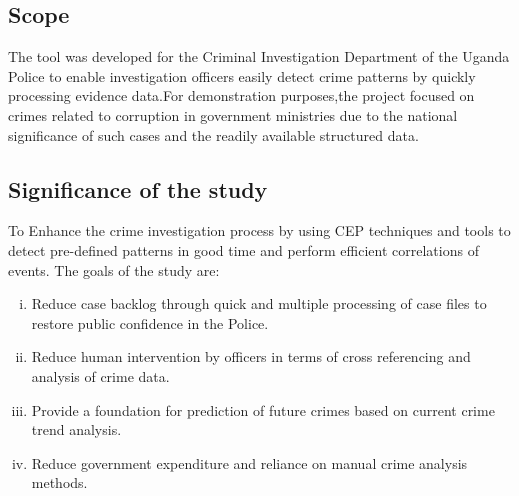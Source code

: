\subsection{Scope}
The tool was developed for the Criminal Investigation Department of the Uganda Police to enable investigation officers easily detect crime patterns by quickly processing evidence data.For demonstration purposes,the project focused on crimes related to corruption in government ministries due to the national significance of such cases and the readily available structured data.

\subsection{Significance of the study}
To Enhance the crime investigation process by using CEP techniques and tools to detect pre-defined patterns in good time and perform efficient correlations of events.
\noindent The goals of the study are:
\begin{enumerate}[(i)]
\item Reduce case backlog through quick and multiple processing of case files to restore public confidence in the Police.
\item Reduce human intervention by officers in terms of cross referencing and analysis of crime data.
\item Provide a foundation for prediction of future crimes based on current crime trend analysis.	
\item Reduce government expenditure and reliance on manual crime analysis methods.

\end{enumerate}

